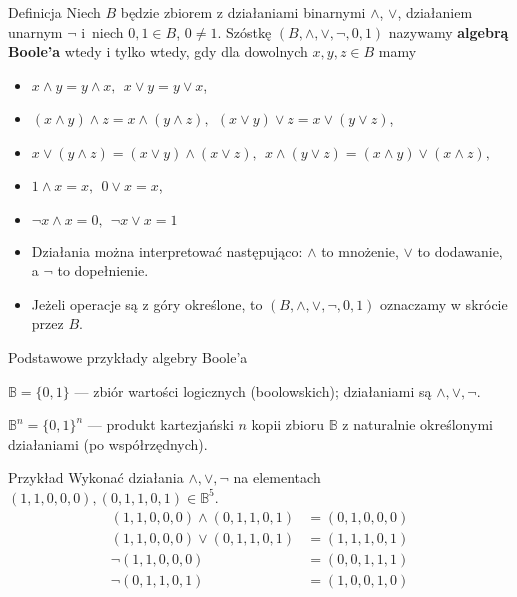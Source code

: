 \documentclass[a4paper,10pt]{beamer}
\begin{document}
\begin{frame}
	
	\begin{block}{Definicja}
		Niech $B$ będzie zbiorem z działaniami binarnymi $\wedge$, $\vee$, działaniem unarnym $\neg$ i~niech $0,1\in B$, $0\neq1$. Szóstkę $(B,\wedge,\vee,\neg,0,1)$ nazywamy {\bf algebrą Boole'a} wtedy i tylko wtedy, gdy dla dowolnych $x,y,z\in B$ mamy
		\begin{itemize}
			\item $x\wedge y=y\wedge x,\ \ x\vee y=y\vee x$,
			\item $(x\wedge y)\wedge z=x\wedge(y\wedge z),\ \ (x\vee y)\vee z=x\vee(y\vee z)$,
			\item $x\vee(y\wedge z)=(x\vee y)\wedge (x\vee z),\ \ x\wedge(y\vee z)=(x\wedge y)\vee (x\wedge z),$
			\item $1\wedge x=x,\ \ 0\vee x=x$,
			\item $\neg x\wedge x=0,\ \ \neg x\vee x=1$
		\end{itemize}
	\end{block}

	\begin{block}{}
		\begin{itemize}
			\item Działania można interpretować następująco: $\wedge$ to mnożenie, $\vee$ to dodawanie, a $\neg$ to dopełnienie.
			\item Jeżeli operacje są z góry określone, to $(B,\wedge,\vee,\neg,0,1)$ oznaczamy w skrócie przez $B$.
		\end{itemize}
	\end{block}
	
\end{frame}


\begin{frame}{Podstawowe przykłady algebry Boole'a}
	
	\begin{block}{}
			$\mathbb{B}=\{0,1\}$ --- zbiór wartości logicznych (boolowskich); działaniami są $\wedge,\vee,\neg$.
	\end{block}

	\begin{block}{}
			$\mathbb{B}^n=\{0,1\}^n$ --- produkt kartezjański $n$ kopii zbioru $\mathbb{B}$ z naturalnie określonymi działaniami (po współrzędnych).
	\end{block}

	\begin{exampleblock}{Przykład}
		Wykonać działania $\wedge,\vee,\neg$ na elementach $(1,1,0,0,0),(0,1,1,0,1)\in\mathbb{B}^5$.
		\begin{align*}
			(1,1,0,0,0)\wedge(0,1,1,0,1)&=(0,1,0,0,0)\\
			(1,1,0,0,0)\vee(0,1,1,0,1)&=(1,1,1,0,1)\\
			\neg(1,1,0,0,0)&=(0,0,1,1,1)\\
			\neg(0,1,1,0,1)&=(1,0,0,1,0)
		\end{align*}
	\end{exampleblock}	
	
\end{frame}
\end{document}
